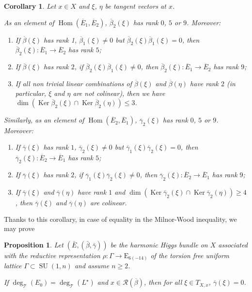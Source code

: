 \documentclass[JEP,XML,SOM,Unicode,NoFloatCountersInSection]{cedram}
\let\mathcal\mathscr
\newenvironment{enumeratea}
{\bgroup\def\theenumi{\alph{enumi}}\begin{enumerate}}
{\end{enumerate}\egroup}
\newenvironment{enumerateap}
{\bgroup\def\theenumi{\alph{enumi}$'$}\begin{enumerate}}
{\end{enumerate}\egroup}
\theoremstyle{plain}
\newtheorem{prop}[theo]{Proposition}
\newtheorem{coro}[theo]{Corollary}
\theoremstyle{definition}
\let\ov\overline
\DeclareMathOperator{\Hom}{Hom}
\DeclareMathOperator{\Ker}{Ker}
\DeclareMathOperator{\SU}{SU}
\newcommand{\cR}{\mathcal{R}}
\newcommand{\cT}{\mathcal{T}}
\newcommand{\ovE}{\ov{E}}
\newcommand{\ovb}{\ov{\beta}}
\newcommand{\ovg}{\ov{\gamma}}
\begin{document}
\begin{coro}\label{lem:ranks} Let $x\in X$ and $\xi$, $\eta$ be tangent vectors at $x$.

As an element of $\Hom(\ovE_1,\ovE_2)$, $\ovb_2(\xi)$ has rank
$0$, $5$ or $9$. Moreover:
\begin{enumeratea}
\item If $\ovb(\xi)$ has rank 1, \ie $\ovb_1(\xi)\neq 0$ but $\ovb_2(\xi)\ovb_1(\xi)=0$, then $\ovb_2(\xi):\ovE_1\to \ovE_2$ has rank $5$;

\item If $\ovb(\xi)$ has rank $2$, \ie if $\ovb_2(\xi)\ovb_1(\xi)\neq 0$, then $\ovb_2(\xi):\ovE_1\to \ovE_2$ has rank $9$;

\item If all non trivial linear combinations of $\ovb(\xi)$ and $\ovb(\eta)$ have rank
$2$ (in particular, $\xi$ and $\eta$ are not colinear), then we have
$\dim(\Ker\ovb_2(\xi)\cap\Ker\ovb_2(\eta))\leq 3$.
\end{enumeratea}

Similarly, as an element of $\Hom(\ovE_2,\ovE_1)$, $\ovg_2(\xi)$ has rank
$0$, $5$ or $9$. Moreover:
\begin{enumerateap}
\item If $\ovg(\xi)$ has rank $1$, \ie $\ovg_2(\xi)\neq 0$ but $\ovg_1(\xi)\ovg_2(\xi)=0$, then $\ovg_2(\xi):\ovE_2\to \ovE_1$ has rank $5$;

\item If $\ovg(\xi)$ has rank $2$, \ie if $\ovg_1(\xi)\ovg_2(\xi)\neq 0$, then $\ovg_2(\xi):\ovE_2\to \ovE_1$ has rank $9$;

\item If $\ovg(\xi)$ and $\ovg(\eta)$ have rank $1$ and $\dim (\Ker \ovg_2(\xi) \cap \Ker \ovg_2(\eta)) \geq 4$, then
$\ovg(\xi)$ and $\ovg(\eta)$ are colinear.
\end{enumerateap}
\end{coro}

Thanks to this corollary, in case of equality in the Milnor-Wood inequality, we may prove

\begin{prop}\label{prop:vanishing} Let $(\bar E, (\bar\beta,\bar\gamma))$ be the harmonic Higgs bundle on $X$
associated with the reductive representation $\rho:\Gamma\to \mathrm{E}_{6(-14)}$ of the torsion free
uniform lattice
$\Gamma\subset\SU(1,n)$ and assume
$n\geq 2$.

If $\deg_\cT(E_0)=\deg_\cT(L^\star)$ and $x\in\cR(\ovb)$, then for all $\xi\in T_{X,x}$, $\ovg(\xi)=0$.
\end{prop}
\end{document}
